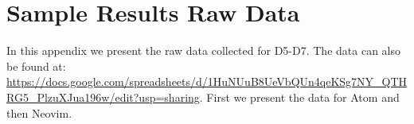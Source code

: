 \section{Sample Results Raw Data}
\label{ap:raw_sample_data}
In this appendix we present the raw data collected for D5-D7. The data can also be found at: \url{https://docs.google.com/spreadsheets/d/1HuNUuB8UeVbQUn4qeKSg7NY_QTHRG5_PlzuXJua196w/edit?usp=sharing}. First we present the data for Atom and then Neovim.


